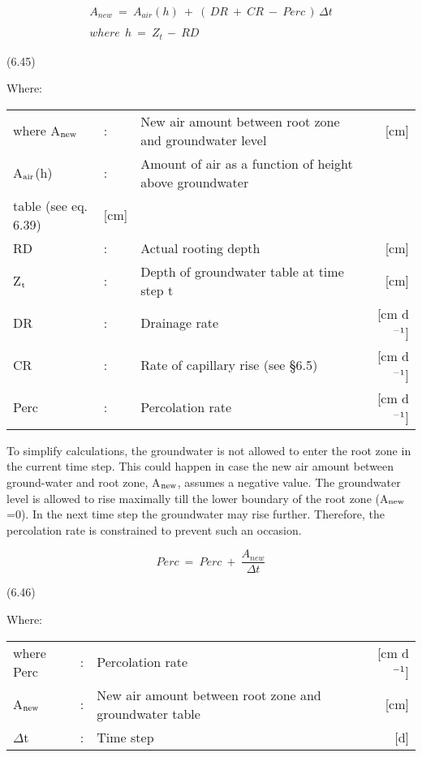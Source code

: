 \begin{eqnarray*}
 A _{new} ~=~ A _{air} (h) ~+~ (\, DR ~+~ CR ~-~ Perc\, )\, \Delta t  \nonumber  \\
\, \nonumber  \\
where~~ h~=~Z _{t~} -~ RD
\end{eqnarray*}

 
\strut\hfill (6.45)


Where:\\
\begin{tabularx}{\textwidth}{llXr}



where A$_{{\rm new}}$ &:& New air amount between root zone and groundwater level  & [cm]\\
A$_{{\rm air}}$(h) &:& Amount of air as a function of height above groundwater \\
   table  (see eq. 6.39) & [cm]\\
RD &:& Actual rooting depth  & [cm]\\
Z$_{{\rm t}}$ &:& Depth of groundwater table at time step t  & [cm]\\
DR &:& Drainage rate  & [cm d$^{{\rm -1}}$]\\
CR &:& Rate of capillary rise (see \S 6.5)  & [cm d$^{{\rm -1}}$]\\
Perc &:& Percolation rate  & [cm d$^{{\rm -1}}$]
\end{tabularx}



To simplify calculations, the groundwater is not allowed to enter the root zone in the
current time step. This could happen in case the new air amount between ground-water
and root zone, A$_{{\rm new}}$, assumes a negative value. The groundwater level is allowed to rise
maximally till the lower boundary of the root zone (A$_{{\rm new}}$=0). In the next time step the
groundwater may rise further. Therefore, the percolation rate is con\-strained to prevent
such an occasion. 

\begin{equation}
Perc ~=~Perc ~+~{\frac{A _{new} }{\Delta t}}
\end{equation}

 
\strut\hfill (6.46)

Where:\\
\begin{tabularx}{\textwidth}{llXr}



where Perc &:& Percolation rate   & [cm d$^{{\rm -1}}$]\\
A$_{{\rm new}}$ &:& New air amount between root zone and groundwater table  & [cm]\\
$\Delta$t &:& Time step  & [d]
\end{tabularx}


